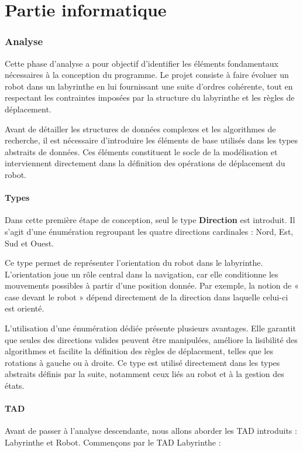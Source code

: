\chapter{Partie informatique}

\subsection{Analyse}

Cette phase d’analyse a pour objectif d’identifier les éléments fondamentaux nécessaires à la conception du programme. Le projet consiste à faire évoluer un robot dans un labyrinthe en lui fournissant une suite d’ordres cohérente, tout en respectant les contraintes imposées par la structure du labyrinthe et les règles de déplacement.

Avant de détailler les structures de données complexes et les algorithmes de recherche, il est nécessaire d’introduire les éléments de base utilisés dans les types abstraits de données. Ces éléments constituent le socle de la modélisation et interviennent directement dans la définition des opérations de déplacement du robot.

\subsubsection{Types}

Dans cette première étape de conception, seul le type \textbf{Direction} est introduit. Il s’agit d’une énumération regroupant les quatre directions cardinales : Nord, Est, Sud et Ouest.

Ce type permet de représenter l’orientation du robot dans le labyrinthe. L’orientation joue un rôle central dans la navigation, car elle conditionne les mouvements possibles à partir d’une position donnée. Par exemple, la notion de « case devant le robot » dépend directement de la direction dans laquelle celui-ci est orienté.

L’utilisation d’une énumération dédiée présente plusieurs avantages. Elle garantit que seules des directions valides peuvent être manipulées, améliore la lisibilité des algorithmes et facilite la définition des règles de déplacement, telles que les rotations à gauche ou à droite. Ce type est utilisé directement dans les types abstraits définis par la suite, notamment ceux liés au robot et à la gestion des états.

\subsubsection{TAD}
Avant de passer à l'analyse descendante, nous allons aborder les TAD introduits : Labyrinthe et Robot. Commençons par le TAD Labyrinthe :

